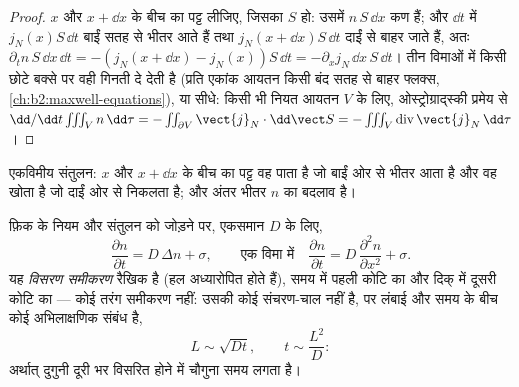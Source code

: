 \begin{proof}
$x$ और $x + \dd x$ के बीच का पट्ट लीजिए, जिसका  $S$ हो: उसमें
$n\,S\,\dd x$ कण हैं; और $\dd t$ में $j_N(x)S\,\dd t$ बाईं
सतह से भीतर आते हैं तथा $j_N(x + \dd x)S\,\dd t$ दाईं से बाहर जाते हैं, अतः
$\partial_t n\,S\,\dd x\,\dd t = -(j_N(x+\dd x) - j_N(x))S\,\dd t =
-\partial_x j_N\,\dd x\,S\,\dd t$। तीन विमाओं में किसी छोटे बक्से पर वही गिनती
 दे देती है (प्रति एकांक आयतन किसी बंद सतह से बाहर फ्लक्स,
\cref{ch:b2:maxwell-equations}), या सीधे: किसी भी नियत
आयतन $V$ के लिए, ओस्ट्रोग्राद्स्की प्रमेय से $\dd/\dd t \iiint_V n\,\dd\tau = -\iint_{\partial V}
\vect{j}_N\cdot\dd\vect S = -\iiint_V \operatorname{div}\vect{j}_N\,\dd\tau$।
\end{proof}

\begin{omfigure}

{\small एकविमीय संतुलन: $x$ और $x + \dd
x$ के बीच का पट्ट वह पाता है जो बाईं ओर से भीतर आता है और वह खोता है जो दाईं ओर से निकलता है;
और अंतर भीतर $n$ का बदलाव है।}
\end{omfigure}

\begin{theorem}\label{thm:b2:particle-diffusion:equation}
फ़िक के नियम और संतुलन को जोड़ने पर, एकसमान $D$ के लिए,
\[
\frac{\partial n}{\partial t} = D\,\Delta n + \sigma ,
\qquad\text{एक विमा में}\quad
\frac{\partial n}{\partial t} = D\,\frac{\partial^2 n}{\partial x^2} + \sigma .
\]
यह \emph{विसरण समीकरण} रैखिक है
(हल अध्यारोपित होते हैं), समय में पहली कोटि का और दिक् में दूसरी कोटि का
--- कोई तरंग समीकरण नहीं: उसकी कोई संचरण-चाल नहीं है, पर लंबाई और समय के बीच
कोई अभिलाक्षणिक संबंध है,
\[
L \sim \sqrt{D t}, \qquad t \sim \frac{L^2}{D} :
\]
अर्थात् दुगुनी दूरी भर विसरित होने में चौगुना समय लगता है।
\end{theorem}

